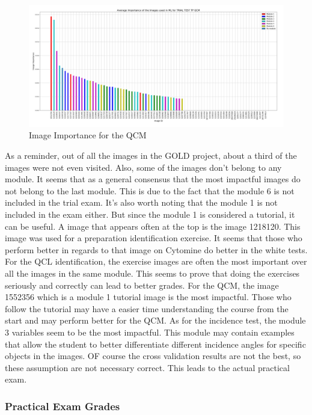 \documentclass[a4paper,11pt]{report}
\numberwithin{figure}{section} %
\begin{document}
      \begin{figure}[H]
      \centering
      \includegraphics[width=.95\linewidth]{im_importance_TRIAL_TEST_TP_QCM_2018-04-29_14_34_19.png}
      \caption{Image Importance for the QCM}
      \label{fig:im_white3}
      \end{figure}
    
    As a reminder, out of all the images in the GOLD project, about a third of the images were not even visited.
    Also, some of the images don't belong to any module.
    It seems that as a general consensus that the most impactful images do not belong to the last module.
    This is due to the fact that the module 6 is not included in the trial exam.
    It's also worth noting that the module 1 is not included in the exam either.
    But since the module 1 is considered a tutorial, it can be useful.
    A image that appears often at the top is the image 1218120.
    This image was used for a preparation identification exercise.
    It seems that those who perform better in regards to that image on Cytomine do better in the white tests.
    For the QCL identification, the exercise images are often the most important over all the images in the same module.
    This seems to prove that doing the exercises seriously and correctly can lead to better grades.
    For the QCM, the image 1552356 which is a module 1 tutorial image is the most impactful.
    Those who follow the tutorial may have a easier time understanding the course from the start and may perform better for the QCM. As for the incidence test, the module 3 variables seem to be the most impactful.
    This module may contain examples that allow the student to better differentiate different incidence angles for specific objects in the images.
    OF course the cross validation results are not the best, so these assumption are not necessary correct. This leads to the actual practical exam.
    
    \subsubsection{Practical Exam Grades}
\end{document}
